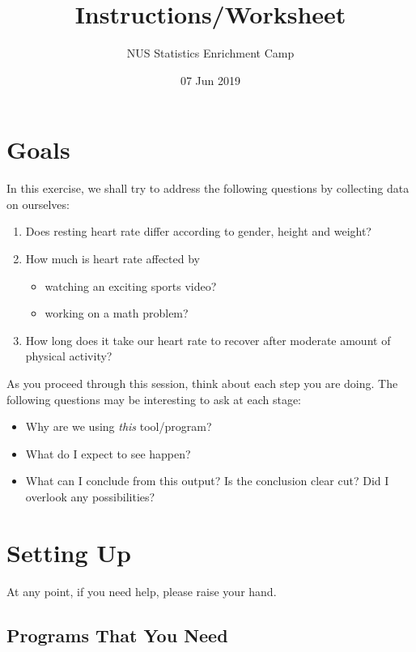 \documentclass[11pt]{article}
\title{Instructions/Worksheet}
\author{NUS Statistics Enrichment Camp}
\date{07 Jun 2019}
\providecommand{\tightlist}{%
  \setlength{\itemsep}{0pt}\setlength{\parskip}{0pt}}
\begin{document}
\maketitle

\hypertarget{goals}{%
\section{Goals}\label{goals}}

In this exercise, we shall try to address the following questions by
collecting data on ourselves:

\begin{enumerate}
\def\labelenumi{\arabic{enumi}.}
\tightlist
\item
  Does resting heart rate differ according to gender, height and weight?
\item
  How much is heart rate affected by

  \begin{itemize}
  \tightlist
  \item
    watching an exciting sports video?
  \item
    working on a math problem?
  \end{itemize}
\item
  How long does it take our heart rate to recover after moderate amount
  of physical activity?
\end{enumerate}

As you proceed through this session, think about each step you are
doing. The following questions may be interesting to ask at each stage:

\begin{itemize}
\tightlist
\item
  Why are we using \emph{this} tool/program?
\item
  What do I expect to see happen?
\item
  What can I conclude from this output? Is the conclusion clear cut? Did
  I overlook any possibilities?
\end{itemize}

\hypertarget{setting-up}{%
\section{Setting Up}\label{setting-up}}

At any point, if you need help, please raise your hand.

\hypertarget{downloading-what-you-need}{%
\subsection{Programs That You Need}\label{downloading-what-you-need}}
\end{document}
